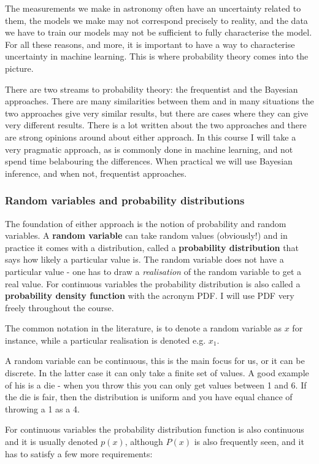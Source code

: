 \documentclass[a4paper,10pt]{article}
\begin{document}
The measurements we make in astronomy often have an uncertainty related to them,  the models we make may not correspond precisely to reality, and the data we have to train our models may not be sufficient to fully characterise the model. For all these reasons, and more, it is important to have a way to characterise uncertainty in machine learning. This is where probability theory comes into the picture.

There are two streams to probability theory: the frequentist and the Bayesian approaches. There are many similarities between them and in many situations the two approaches give very similar results, but there are cases where they can give very different results. There is a lot written about the two approaches and there are strong opinions around about either approach. In this course I will take a very pragmatic approach, as is commonly done in machine learning, and not spend time belabouring the differences. When practical we will use Bayesian inference, and when not, frequentist approaches.

\subsubsection{ Random variables and probability distributions}
The foundation of either approach is the notion of probability and random variables. A \textbf{random variable} can take random values (obviously!) and in practice it comes with a distribution, called a \textbf{probability distribution} that says how likely a particular value is. The random variable does not have a particular value - one has to draw a \textit{realisation} of the random variable to get a real value. For continuous variables the probability distribution is also called a \textbf{probability density function} with the acronym PDF. I will use PDF very freely throughout the course.

The common notation in the literature, is to denote a random variable as $x$ for instance, while a particular realisation is denoted e.g. $x_1$.

A random variable can be continuous, this is the main focus for us, or it can be discrete. In the latter case it can only take a finite set of values. A good example of his is a die - when you throw this you can only get values between 1 and 6. If the die is fair, then the distribution is uniform and you have equal chance of throwing a 1 as a 4.

For continuous variables the probability distribution function is also continuous and it is usually denoted $p(x)$, although $P(x)$ is also frequently seen, and it has to satisfy a few more requirements:
\end{document}
